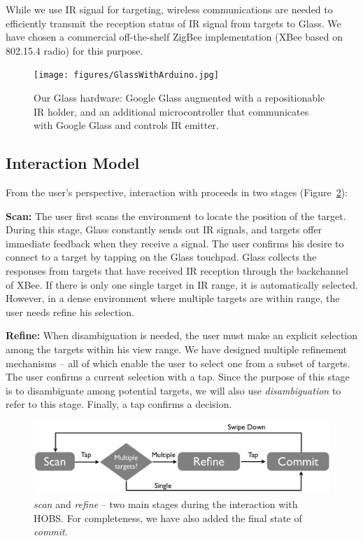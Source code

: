 While we use IR signal for targeting, wireless communications are needed to efficiently transmit the reception status of IR signal from targets to Glass. We have chosen a commercial off-the-shelf ZigBee implementation (XBee based on 802.15.4 radio) for this purpose.


\begin{figure}[t]
\centering
\texttt{[image: figures/GlassWithArduino.jpg]}
\caption{Our Glass hardware: Google Glass augmented with a repositionable IR holder, and an additional microcontroller that communicates with Google Glass and controls IR emitter.}
\label{fig:glass}
\end{figure}

\subsection{Interaction Model}
From the user's perspective, interaction with \systemname proceeds in two stages (Figure~\ref{fig:interaction}): 

{\bf Scan:} The user first scans the environment to locate the position of the target. During this stage, Glass constantly sends out IR signals, and  targets offer immediate feedback when they receive a signal. The user confirms his desire to connect to a target by tapping on the Glass touchpad. Glass collects the responses from targets that have received IR reception through the backchannel of XBee. If there is only one single target in IR range, it is automatically selected. However, in a dense environment where multiple targets are within range, the user needs refine his selection.

{\bf Refine:} When disambiguation is needed, the user must make an explicit selection among the targets within his view range. We have designed multiple refinement mechanisms -- all of which enable the user to select one from a subset of targets. The user confirms a current selection with a tap. Since the purpose of this stage is to disambiguate among potential targets, we will also use {\em disambiguation} to refer to this stage. Finally, a tap confirms a decision.


\begin{figure}[t!]
\centering
\includegraphics[width=\columnwidth]{figures/interactionModel2.pdf}
\caption{{\em scan} and {\em refine} -- two main stages during the interaction with HOBS. For completeness, we have also added the final state of {\em commit}.} 
\label{fig:interaction}
\end{figure}

